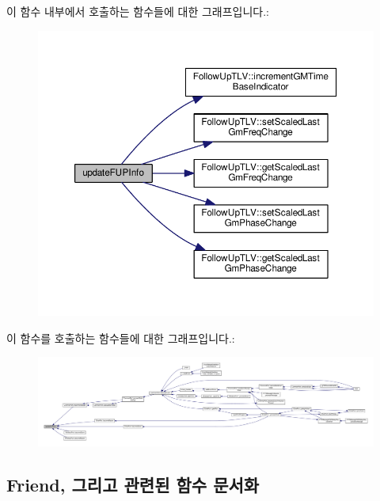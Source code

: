 이 함수 내부에서 호출하는 함수들에 대한 그래프입니다.\+:
\nopagebreak
\begin{figure}[H]
\begin{center}
\leavevmode
\includegraphics[width=350pt]{class_i_e_e_e1588_clock_aa41be6e57b021a11d16990ba72a69188_cgraph}
\end{center}
\end{figure}




이 함수를 호출하는 함수들에 대한 그래프입니다.\+:
\nopagebreak
\begin{figure}[H]
\begin{center}
\leavevmode
\includegraphics[width=350pt]{class_i_e_e_e1588_clock_aa41be6e57b021a11d16990ba72a69188_icgraph}
\end{center}
\end{figure}




\subsection{Friend, 그리고 관련된 함수 문서화}
